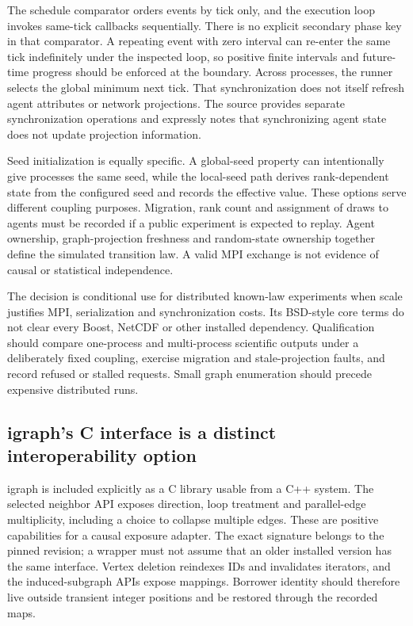 The schedule comparator orders events by tick only, and the execution loop invokes same-tick callbacks sequentially. There is no explicit secondary phase key in that comparator. A repeating event with zero interval can re-enter the same tick indefinitely under the inspected loop, so positive finite intervals and future-time progress should be enforced at the boundary. Across processes, the runner selects the global minimum next tick. That synchronization does not itself refresh agent attributes or network projections. The source provides separate synchronization operations and expressly notes that synchronizing agent state does not update projection information.\citep{exec25_cnet_repast}

Seed initialization is equally specific. A global-seed property can intentionally give processes the same seed, while the local-seed path derives rank-dependent state from the configured seed and records the effective value. These options serve different coupling purposes. Migration, rank count and assignment of draws to agents must be recorded if a public experiment is expected to replay. Agent ownership, graph-projection freshness and random-state ownership together define the simulated transition law. A valid MPI exchange is not evidence of causal or statistical independence.\citep{exec25_cnet_repast,exec25_cnet_choice}

The decision is conditional use for distributed known-law experiments when scale justifies MPI, serialization and synchronization costs. Its BSD-style core terms do not clear every Boost, NetCDF or other installed dependency. Qualification should compare one-process and multi-process scientific outputs under a deliberately fixed coupling, exercise migration and stale-projection faults, and record refused or stalled requests. Small graph enumeration should precede expensive distributed runs.\citep{exec25_cnet_repast,exec25_cnet_choice}

\subsection{igraph's C interface is a distinct interoperability option}

igraph is included explicitly as a C library usable from a C++ system. The selected neighbor API exposes direction, loop treatment and parallel-edge multiplicity, including a choice to collapse multiple edges. These are positive capabilities for a causal exposure adapter. The exact signature belongs to the pinned revision; a wrapper must not assume that an older installed version has the same interface. Vertex deletion reindexes IDs and invalidates iterators, and the induced-subgraph APIs expose mappings. Borrower identity should therefore live outside transient integer positions and be restored through the recorded maps.\citep{exec25_cnet_igraph}

